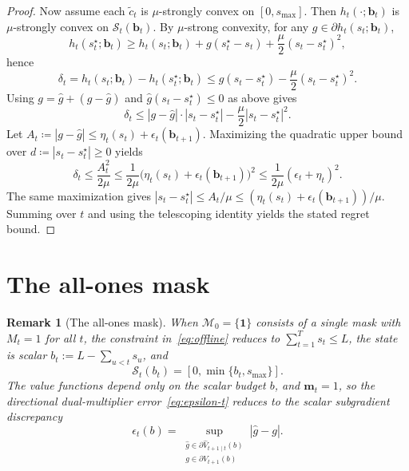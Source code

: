 \documentclass[11pt]{article}
\newtheorem*{remark}{Remark}
\newcommand{\1}{\mathbf{1}}
\newcommand{\eqdef}{\coloneqq}
\newcommand{\mcal}{\mathcal{M}}
\newcommand{\scalt}{\mathcal{S}_{t}}
\newcommand{\subdiff}{\partial}
\begin{document}
\begin{proof}
  Now assume each $\tilde{c}_t$ is $\mu$-strongly convex on $[0,s_{\max}]$.
  Then $h_t(\cdot;\mathbf{b}_t)$ is $\mu$-strongly convex on $\scalt(\mathbf{b}_t)$.
  By $\mu$-strong convexity, for any $g \in \subdiff h_t(s_t;\mathbf{b}_t)$,
  \begin{equation*}
    h_t(s_t^{\star};\mathbf{b}_t)
    \geq
    h_t(s_t;\mathbf{b}_t) + g(s_t^{\star}-s_t) + \frac{\mu}{2}(s_t-s_t^{\star})^2,
  \end{equation*}
  hence
  \begin{equation*}
    \delta_t
    = h_t(s_t;\mathbf{b}_t)-h_t(s_t^{\star};\mathbf{b}_t)
    \leq g(s_t-s_t^{\star}) - \frac{\mu}{2}(s_t-s_t^{\star})^2.
  \end{equation*}
  Using $g=\hat{g}+(g-\hat{g})$ and $\hat{g}(s_t-s_t^{\star}) \leq 0$ as above gives
  \begin{equation*}
    \delta_t
    \leq |g-\hat{g}| \cdot |s_t-s_t^{\star}| - \frac{\mu}{2}|s_t-s_t^{\star}|^2.
  \end{equation*}
  Let $A_t \eqdef |g-\hat{g}| \leq \eta_t(s_t)+\epsilon_t(\mathbf{b}_{t+1})$.
  Maximizing the quadratic upper bound over $d \eqdef |s_t-s_t^{\star}| \geq 0$ yields
  \begin{equation*}
    \delta_t \leq \frac{A_t^2}{2\mu}
    \leq \frac{1}{2\mu}\bigl(\eta_t(s_t)+\epsilon_t(\mathbf{b}_{t+1})\bigr)^2
    \leq \frac{1}{2\mu}(\epsilon_t+\eta_t)^2.
  \end{equation*}
  The same maximization gives $|s_t-s_t^{\star}| \leq A_t/\mu \leq (\eta_t(s_t)+\epsilon_t(\mathbf{b}_{t+1}))/\mu$.
  Summing over $t$ and using the telescoping identity yields the stated regret bound.
\end{proof}

\section{The all-ones mask}
\label{sec:all-ones-mask}%

\begin{remark}[The all-ones mask]
  \label{rem:all-ones-mask}%
  When $\mcal_{0} = \{\1\}$ consists of a single mask with $M_t = 1$ for all $t$,
  the constraint in~\eqref{eq:offline} reduces to $\sum_{t=1}^{T} s_t \leq L$, the state is scalar $b_t := L - \sum_{u < t} s_u$, and
  \begin{equation*}
    \scalt(b_t) = [0, \min\{b_t, s_{\max}\}].
  \end{equation*}
  The value functions depend only on the scalar budget $b$, and $\mathbf{m}_t = 1$, so the directional dual-multiplier error~\eqref{eq:epsilon-t} reduces to the scalar subgradient discrepancy
  \begin{equation*}
    \epsilon_t(b) = \sup_{\substack{\hat{g} \in \subdiff \hat{V}_{t+1 \mid t}(b) \\ g \in \subdiff V_{t+1}(b)}} |\hat{g} - g|.
  \end{equation*}
\end{remark}
\end{document}
